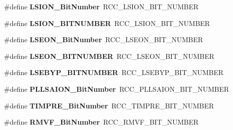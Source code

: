 \begin{DoxyCompactItemize}
\item 
\mbox{\label{group___h_a_l___r_c_c___aliased_ga3f9dbe50769ce2a63ae12520433b9b40}} 
\#define {\bfseries L\+S\+I\+O\+N\+\_\+\+Bit\+Number}~R\+C\+C\+\_\+\+L\+S\+I\+O\+N\+\_\+\+B\+I\+T\+\_\+\+N\+U\+M\+B\+ER
\item 
\mbox{\label{group___h_a_l___r_c_c___aliased_ga240275048c246bf22b5fce8ff4f7b33d}} 
\#define {\bfseries L\+S\+I\+O\+N\+\_\+\+B\+I\+T\+N\+U\+M\+B\+ER}~R\+C\+C\+\_\+\+L\+S\+I\+O\+N\+\_\+\+B\+I\+T\+\_\+\+N\+U\+M\+B\+ER
\item 
\mbox{\label{group___h_a_l___r_c_c___aliased_ga9d9171281f96c7cd004520985e3ae27f}} 
\#define {\bfseries L\+S\+E\+O\+N\+\_\+\+Bit\+Number}~R\+C\+C\+\_\+\+L\+S\+E\+O\+N\+\_\+\+B\+I\+T\+\_\+\+N\+U\+M\+B\+ER
\item 
\mbox{\label{group___h_a_l___r_c_c___aliased_ga9dcf3f6a2fd518a7fd96f96280f81f8f}} 
\#define {\bfseries L\+S\+E\+O\+N\+\_\+\+B\+I\+T\+N\+U\+M\+B\+ER}~R\+C\+C\+\_\+\+L\+S\+E\+O\+N\+\_\+\+B\+I\+T\+\_\+\+N\+U\+M\+B\+ER
\item 
\mbox{\label{group___h_a_l___r_c_c___aliased_ga6af20e20f5b32e8a85f607ea43c338df}} 
\#define {\bfseries L\+S\+E\+B\+Y\+P\+\_\+\+B\+I\+T\+N\+U\+M\+B\+ER}~R\+C\+C\+\_\+\+L\+S\+E\+B\+Y\+P\+\_\+\+B\+I\+T\+\_\+\+N\+U\+M\+B\+ER
\item 
\mbox{\label{group___h_a_l___r_c_c___aliased_ga786a15b370532d6429e03a9f9d226be7}} 
\#define {\bfseries P\+L\+L\+S\+A\+I\+O\+N\+\_\+\+Bit\+Number}~R\+C\+C\+\_\+\+P\+L\+L\+S\+A\+I\+O\+N\+\_\+\+B\+I\+T\+\_\+\+N\+U\+M\+B\+ER
\item 
\mbox{\label{group___h_a_l___r_c_c___aliased_ga3e4d33566ef60a5220ce491e74a34478}} 
\#define {\bfseries T\+I\+M\+P\+R\+E\+\_\+\+Bit\+Number}~R\+C\+C\+\_\+\+T\+I\+M\+P\+R\+E\+\_\+\+B\+I\+T\+\_\+\+N\+U\+M\+B\+ER
\item 
\mbox{\label{group___h_a_l___r_c_c___aliased_ga3a0580593374569f2663f1432812f8fe}} 
\#define {\bfseries R\+M\+V\+F\+\_\+\+Bit\+Number}~R\+C\+C\+\_\+\+R\+M\+V\+F\+\_\+\+B\+I\+T\+\_\+\+N\+U\+M\+B\+ER

\end{DoxyCompactItemize}
